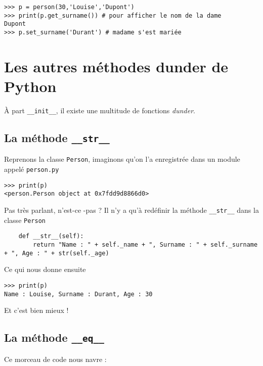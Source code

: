 \documentclass[a4paper,10pt,cours,firamath]{nsi}
\begin{document}
\begin{pyc}
	\begin{verbatim}
>>> p = person(30,'Louise','Dupont')
>>> print(p.get_surname()) # pour afficher le nom de la dame
Dupont
>>> p.set_surname('Durant') # madame s'est mariée
\end{verbatim}
\end{pyc}

\section{Les autres méthodes dunder de Python}

À part \texttt{__init__}, il existe une multitude de fonctions \textit{dunder}.

\subsection{La méthode \texttt{\_\_str\_\_}}
Reprenons la classe \texttt{Person}, imaginons qu'on l'a enregistrée dans un module appelé \texttt{person.py}
\begin{pyc}
	\begin{verbatim}
>>> print(p)
<person.Person object at 0x7fdd9d8866d0>
\end{verbatim}
\end{pyc}
Pas très parlant, n'est-ce -pas ? Il n'y a qu'à redéfinir la méthode \texttt{__str__} dans la classe \texttt{Person}
\begin{pyc}
	\begin{verbatim}
	def __str__(self):
		return "Name : " + self._name + ", Surname : " + self._surname + ", Age : " + str(self._age)
\end{verbatim}
\end{pyc}
Ce qui nous donne ensuite 
\begin{pyc}
	\begin{verbatim}
>>> print(p)
Name : Louise, Surname : Durant, Age : 30
\end{verbatim}
\end{pyc}
Et c'est bien mieux !


\subsection{La méthode \texttt{\_\_eq\_\_}}

Ce morceau de code nous navre :
\end{document}
